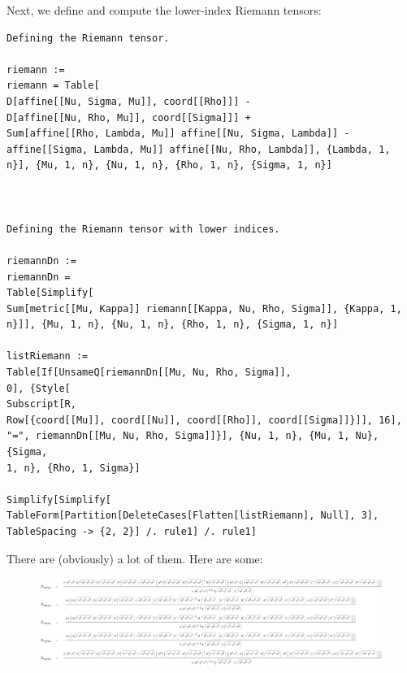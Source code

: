 \documentclass{book}
\theoremstyle{definition}
\begin{document}
Next, we define and compute the lower-index Riemann tensors:
\begin{lstlisting}
Defining the Riemann tensor.

riemann := 
riemann = Table[
D[affine[[Nu, Sigma, Mu]], coord[[Rho]]] - 
D[affine[[Nu, Rho, Mu]], coord[[Sigma]]] + 
Sum[affine[[Rho, Lambda, Mu]] affine[[Nu, Sigma, Lambda]] - 
affine[[Sigma, Lambda, Mu]] affine[[Nu, Rho, Lambda]], {Lambda, 1, 
n}], {Mu, 1, n}, {Nu, 1, n}, {Rho, 1, n}, {Sigma, 1, n}]



Defining the Riemann tensor with lower indices.

riemannDn := 
riemannDn = 
Table[Simplify[
Sum[metric[[Mu, Kappa]] riemann[[Kappa, Nu, Rho, Sigma]], {Kappa, 1, 
n}]], {Mu, 1, n}, {Nu, 1, n}, {Rho, 1, n}, {Sigma, 1, n}]

listRiemann := 
Table[If[UnsameQ[riemannDn[[Mu, Nu, Rho, Sigma]], 
0], {Style[
Subscript[R, 
Row[{coord[[Mu]], coord[[Nu]], coord[[Rho]], coord[[Sigma]]}]], 16], 
"=", riemannDn[[Mu, Nu, Rho, Sigma]]}], {Nu, 1, n}, {Mu, 1, Nu}, {Sigma, 
1, n}, {Rho, 1, Sigma}]

Simplify[Simplify[
TableForm[Partition[DeleteCases[Flatten[listRiemann], Null], 3], 
TableSpacing -> {2, 2}] /. rule1] /. rule1]
\end{lstlisting}

There are (obviously) a lot of them. Here are some:
\begin{figure}[!htb]
	\centering
	\includegraphics[scale=0.25]{riemann}
\end{figure}
\end{document}

